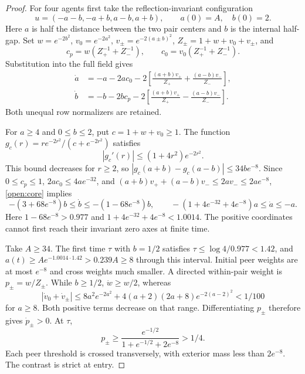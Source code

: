\begin{proof}
For four agents first take the reflection-invariant configuration
\begin{equation}
u=(-a-b,-a+b,a-b,a+b),\qquad a(0)=A,\quad b(0)=2.
\end{equation}
Here $a$ is half the distance between the two pair centers and $b$ is the internal half-gap. Set $w=e^{-2b^2}$, $v_0=e^{-2a^2}$, $v_\pm=e^{-2(a\pm b)^2}$,
$Z_\pm=1+w+v_0+v_\pm$, and
\begin{equation}
c_p=w(Z_+^{-1}+Z_-^{-1}),
\qquad c_0=v_0(Z_+^{-1}+Z_-^{-1}).
\end{equation}
Substitution into the full field gives
\begin{equation}
\begin{split}
\dot a&=-a-2ac_0
-2\left[\frac{(a+b)v_+}{Z_+}+\frac{(a-b)v_-}{Z_-}\right],\\
\dot b&=-b-2bc_p
-2\left[\frac{(a+b)v_+}{Z_+}-\frac{(a-b)v_-}{Z_-}\right].
\end{split}
\label{open:core}
\end{equation}
Both unequal row normalizers are retained.

For $a\ge4$ and $0\le b\le2$, put $c=1+w+v_0\ge1$. The function
$g_c(r)=r e^{-2r^2}/(c+e^{-2r^2})$ satisfies
\begin{equation}
|g_c'(r)|\le(1+4r^2)e^{-2r^2}.
\end{equation}
This bound decreases for $r\ge2$, so
$|g_c(a+b)-g_c(a-b)|\le34be^{-8}$.
Since $0\le c_p\le1$, $2ac_0\le4ae^{-32}$, and $(a+b)v_++(a-b)v_-\le2av_-\le2ae^{-8}$, \cref{open:core} implies
\begin{equation}
-(3+68e^{-8})b\le\dot b\le-(1-68e^{-8})b,\qquad -(1+4e^{-32}+4e^{-8})a\le\dot a\le-a.
\label{open:early-bounds}
\end{equation}
Here $1-68e^{-8}>0.977$ and $1+4e^{-32}+4e^{-8}<1.0014$. The positive coordinates cannot first reach their invariant zero axes at finite time.

Take $A\ge34$. The first time $\tau$ with $b=1/2$ satisfies
$\tau\le\log4/0.977<1.42$, and $a(t)\ge Ae^{-1.0014\cdot1.42}>0.239A\ge8$ through this interval. Initial peer weights are at most $e^{-8}$ and cross weights much smaller. A directed within-pair weight is $p_\pm=w/Z_\pm$. While $b\ge1/2$,
$\dot w\ge w/2$, whereas
\begin{equation}
|\dot v_0+\dot v_\pm|
\le8a^2e^{-2a^2}
+4(a+2)(2a+8)e^{-2(a-2)^2}<1/100
\end{equation}
for $a\ge8$. Both positive terms decrease on that range. Differentiating $p_\pm$ therefore gives $\dot p_\pm>0$. At $\tau$,
\begin{equation}
p_\pm\ge\frac{e^{-1/2}}{1+e^{-1/2}+2e^{-8}}>1/4.
\end{equation}
Each peer threshold is crossed transversely, with exterior mass less than $2e^{-8}$. The contrast is strict at entry.


\end{proof}
